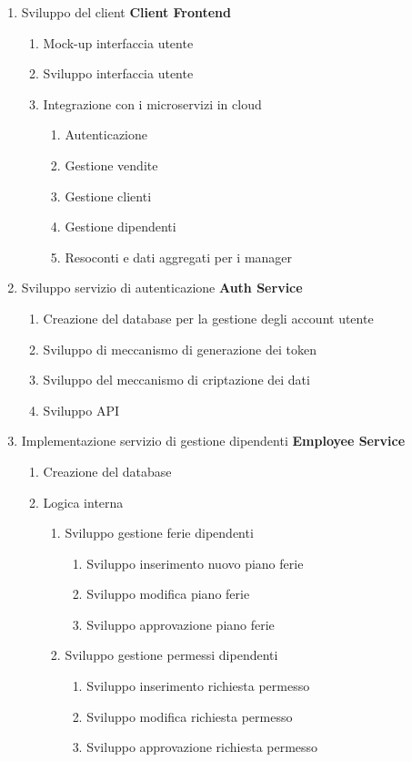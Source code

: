 \documentclass{article}
\begin{document}
  \begin{enumerate}
    \item Sviluppo del client \textbf{Client Frontend}
    \begin{enumerate}
        \item Mock-up interfaccia utente
        \item Sviluppo interfaccia utente
        \item Integrazione con i microservizi in cloud
        \begin{enumerate}
            \item Autenticazione
            \item Gestione vendite
            \item Gestione clienti
            \item Gestione dipendenti
            \item Resoconti e dati aggregati per i manager
        \end{enumerate}
    \end{enumerate}
    \item Sviluppo servizio di autenticazione \textbf{Auth Service}
    \begin{enumerate}
        \item Creazione del database per la gestione degli account utente
        \item Sviluppo di meccanismo di generazione dei token
        \item Sviluppo del meccanismo di criptazione dei dati
        \item Sviluppo API
    \end{enumerate}
    \item Implementazione servizio di gestione dipendenti \textbf{Employee Service}
    \begin{enumerate}
        \item Creazione del database
        \item Logica interna
        \begin{enumerate}
            \item Sviluppo gestione ferie dipendenti
            \begin{enumerate}
                \item Sviluppo inserimento nuovo piano ferie
                \item Sviluppo modifica piano ferie
                \item Sviluppo approvazione piano ferie
            \end{enumerate}
            \item Sviluppo gestione permessi dipendenti
            \begin{enumerate}
                \item Sviluppo inserimento richiesta permesso
                \item Sviluppo modifica richiesta permesso
                \item Sviluppo approvazione richiesta permesso
            \end{enumerate}
        \end{enumerate}


\end{enumerate}
\end{enumerate}
\end{document}
